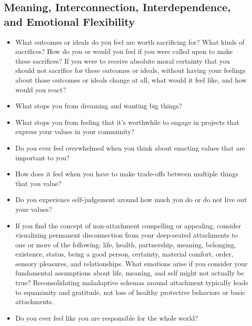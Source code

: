 \documentclass[12pt,letterpaper]{book}
\begin{document}
\subsection*{Meaning, Interconnection, Interdependence, and Emotional Flexibility }
\begin{itemize}
    \item What outcomes or ideals do you feel are worth sacrificing for? What kinds of sacrifices? How do you or would you feel if you were called upon to make these sacrifices? If you were to receive absolute moral certainty that you should not sacrifice for these outcomes or ideals, without having your feelings about those outcomes or ideals change at all, what would it feel like, and how would you react?
    \item What stops you from dreaming and wanting big things?
    \item What stops you from feeling that it's worthwhile to engage in projects that express your values in your community?
    \item Do you ever feel overwhelmed when you think about enacting values that are important to you?
    \item How does it feel when you have to make trade-offs between multiple things that you value?
    \item Do you experience self-judgement around how much you do or do not live out your values?
    \item If you find the concept of non-attachment compelling or appealing, consider visualizing permanent disconnection from your deep-seated attachments to one or more of the following: life, health, partnership, meaning, belonging, existence, status, being a good person, certainty, material comfort, order, sensory pleasures, and relationships. What emotions arise if you consider your fundamental assumptions about life, meaning, and self might not actually be true? Reconsolidating maladaptive schemas around attachment typically leads to equanimity and gratitude, not loss of healthy protective behaviors or basic attachments.
    \item Do you ever feel like you are responsible for the whole world?
\end{itemize}
\end{document}
